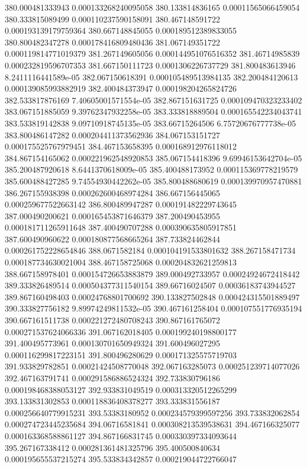 {380.000481333943 0.000133268240095058
380.133814836165 0.00011565066459054
380.333815089499 0.000110237590158091
380.467148591722 0.000193139179759364
380.667148845055 0.000189512389833055
380.800482347278 0.000178416809480436
381.067149351722 0.000119814771019379
381.267149605056 0.000144951076516352
381.46714985839 0.000232819596707353
381.667150111723 0.0001306226737729
381.800483613946 8.2411116441589e-05
382.067150618391 0.000105489513984135
382.200484120613 0.000139085993882919
382.400484373947 0.000198204265824726
382.533817876169 7.40605001571554e-05
382.867151631725 0.000109470323233402
383.067151885059 9.39762347932258e-05
383.333818889504 0.000165542234043741
383.533819142838 9.09710918745135e-05
383.66715264506 6.75720676777738e-05
383.800486147282 0.000204411373562936
384.067153151727 0.000175525767979451
384.467153658395 0.000168912976118012
384.867154165062 0.000221962548920853
385.067154418396 9.69946153642704e-05
385.200487920618 8.6441370618009e-05
385.400488173952 0.000115369778219579
385.600488427285 9.74554930442262e-05
385.800488680619 0.000139970957470881
386.267155938398 0.000262600468974284
386.667156445065 0.000259677522663142
386.800489947287 0.000191482229743645
387.000490200621 0.000165453871646379
387.200490453955 0.000181711265911648
387.400490707288 0.000390635805917851
387.600490960622 0.000180877568665264
387.733824462844 0.000261752228654846
388.0671582184 0.000104191533801632
388.267158471734 0.000187734630021004
388.467158725068 0.000204832621259813
388.667158978401 0.000154726653883879
389.000492733957 0.00024924672418442
389.333826489514 0.000504377311540154
389.66716024507 0.00036183743944527
389.867160498403 0.00024768801700692
390.133827502848 0.000424315501889497
390.333827756182 9.89974249811532e-05
390.467161258404 0.000107551776935194
390.667161511738 0.000221272480708243
390.867161765072 0.000271537624066336
391.067162018405 0.000199240198800177
391.400495773961 0.000130701650949324
391.600496027295 0.000116299817223151
391.800496280629 0.000171325575719703
391.933829782851 0.00021424508770048
392.067163285073 0.000251239714077026
392.467163791741 0.000291586886524324
392.733830796186 0.000198468388053127
392.933831049519 0.000313320512265299
393.133831302853 0.000118836408378277
393.333831556187 0.000256640779915231
393.53383180952 0.000234579399597256
393.733832062854 0.000274723445235684
394.06716581841 0.000308213539538631
394.467166325077 0.000163368588861127
394.867166831745 0.000330397334093644
395.267167338412 0.000281361481325796
395.400500840634 0.000195655537215274
395.533834342857 0.000219044722766047
}
